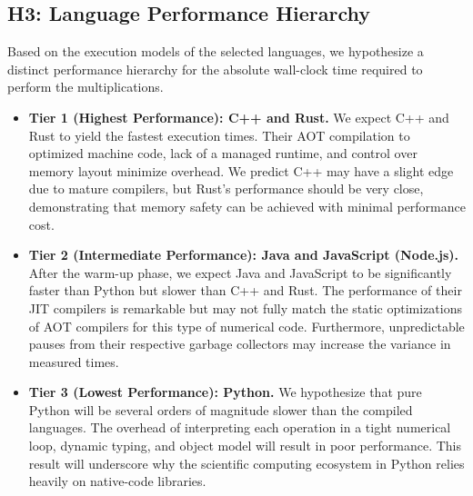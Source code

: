 \documentclass[11pt, a4paper, titlepage]{scrartcl}
\begin{document}
\subsection{H3: Language Performance Hierarchy}
Based on the execution models of the selected languages, we hypothesize a distinct performance hierarchy for the absolute wall-clock time required to perform the multiplications.
\begin{itemize}
    \item \textbf{Tier 1 (Highest Performance): C++ and Rust.} We expect C++ and Rust to yield the fastest execution times. Their AOT compilation to optimized machine code, lack of a managed runtime, and control over memory layout minimize overhead. We predict C++ may have a slight edge due to mature compilers, but Rust's performance should be very close, demonstrating that memory safety can be achieved with minimal performance cost.
    \item \textbf{Tier 2 (Intermediate Performance): Java and JavaScript (Node.js).} After the warm-up phase, we expect Java and JavaScript to be significantly faster than Python but slower than C++ and Rust. The performance of their JIT compilers is remarkable but may not fully match the static optimizations of AOT compilers for this type of numerical code. Furthermore, unpredictable pauses from their respective garbage collectors may increase the variance in measured times.
    \item \textbf{Tier 3 (Lowest Performance): Python.} We hypothesize that pure Python will be several orders of magnitude slower than the compiled languages. The overhead of interpreting each operation in a tight numerical loop, dynamic typing, and object model will result in poor performance. This result will underscore why the scientific computing ecosystem in Python relies heavily on native-code libraries.
\end{itemize}
\end{document}
